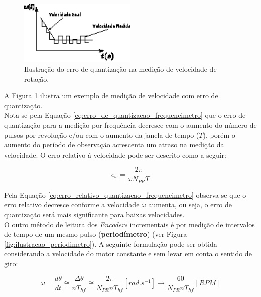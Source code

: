 \begin{figure}[H]
    \centering
    \includegraphics[width=0.5\textwidth]{figuras/ilustracoes/ilustracao_erro_de_quantizacao.eps}
    \caption{Ilustração do erro de quantização na medição de velocidade de rotação.}
    \label{fig:ilustracao_erro_quantizacao}
\end{figure}

A Figura \ref{fig:ilustracao_erro_quantizacao} ilustra um exemplo de medição de velocidade com erro de quantização.\\

Nota-se pela Equação \ref{eq:erro_de_quantizacao_frequencimetro} que o erro de quantização para a medição por frequência decresce com o aumento do número de pulsos por revolução e/ou com o aumento da janela de tempo ($T$), porém o aumento do período de observação acrescenta um atraso na medição da velocidade. O erro relativo à velocidade pode ser descrito como a seguir:

\begin{equation}
    e_{\omega} = \frac{2\pi}{\omega N_{PR} T}
    \label{eq:erro_relativo_quantizacao_frequencimetro}
\end{equation}

Pela Equação \ref{eq:erro_relativo_quantizacao_frequencimetro} observa-se que o erro relativo decresce conforme a velocidade $\omega$ aumenta, ou seja, o erro de quantização será mais significante para baixas velocidades.\\

O outro método de leitura dos \emph{Encoders} incrementais é por medição de intervalos de tempo de um mesmo pulso (\textbf{periodímetro}) (ver Figura \ref{fig:ilustracao_periodimetro}). A seguinte formulação pode ser obtida considerando a velocidade do motor constante e sem levar em conta o sentido de giro:

\begin{equation}
    \omega = \frac{d\theta}{dt} \cong \frac{\Delta{\theta}}{nT_{hf}} \cong \frac{2\pi}{N_{PR} n T_{hf}} [rad.s^{-1}] \xrightarrow{} \frac{60}{N_{PR} n T_{hf}} [RPM]
    \label{eq:omega_periodimetro}
\end{equation}

